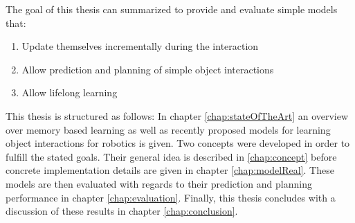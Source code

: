 The goal of this thesis can summarized to provide and evaluate simple models that:

\begin{enumerate}
	\item Update themselves incrementally during the interaction
	\item Allow prediction and planning of simple object interactions %
	\item Allow lifelong learning
\end{enumerate}

This thesis is structured as follows: In chapter \ref{chap:stateOfTheArt} an overview over memory based learning as well as recently proposed models for learning object interactions for robotics is given. Two concepts were developed in order to fulfill the stated goals. Their general idea is described in \ref{chap:concept} before concrete implementation details are given in chapter \ref{chap:modelReal}. These models are then evaluated with regards to their prediction and planning performance in chapter \ref{chap:evaluation}. Finally, this thesis concludes with a discussion of these results in chapter \ref{chap:conclusion}.

